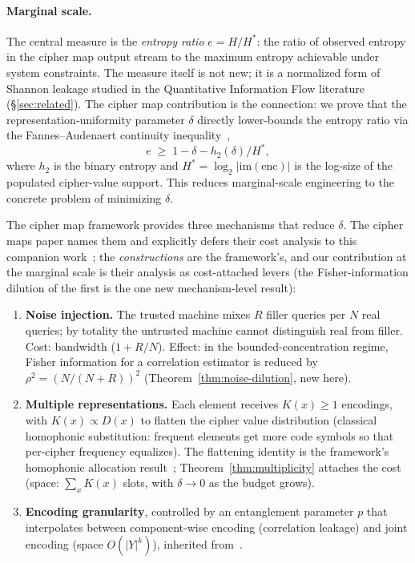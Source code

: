 \documentclass[conference]{IEEEtran}
\theoremstyle{definition}
\theoremstyle{plain}
\theoremstyle{remark}
\newcommand{\enc}{\mathrm{enc}}
\begin{document}
\paragraph{Marginal scale.}
The central measure is the \emph{entropy ratio} $e = H/H^*$: the ratio
of observed entropy in the cipher map output stream to the maximum
entropy achievable under system constraints.  The measure itself is
not new; it is a normalized form of Shannon leakage studied in the
Quantitative Information Flow literature
(\S\ref{sec:related}).  The cipher map contribution is the connection:
we prove that the representation-uniformity parameter $\delta$
directly lower-bounds the entropy ratio via the Fannes--Audenaert
continuity inequality~\cite{fannes1973continuity,audenaert2007sharp},
\[
e \;\geq\; 1 - \delta - h_2(\delta)/H^*,
\]
where $h_2$ is the binary entropy and $H^* = \log_2|\mathrm{im}(\enc)|$
is the log-size of the populated cipher-value support.  This reduces
marginal-scale
engineering to the concrete problem of minimizing $\delta$.

The cipher map framework provides three mechanisms that reduce
$\delta$.  The cipher maps paper names them and explicitly defers
their cost analysis to this companion
work~\cite[Rem.~5.1]{towell2026cipher}; the \emph{constructions} are
the framework's, and our contribution at the marginal scale is their
analysis as cost-attached levers (the Fisher-information dilution of
the first is the one new mechanism-level result):

\begin{enumerate}
\item \textbf{Noise injection.}  The trusted machine mixes $R$ filler
  queries per $N$ real queries; by totality the untrusted machine
  cannot distinguish real from filler.  Cost: bandwidth ($1 + R/N$).
  Effect: in the bounded-concentration regime, Fisher information for a
  correlation estimator is reduced by $\rho^2 = (N/(N+R))^2$
  (Theorem~\ref{thm:noise-dilution}, new here).

\item \textbf{Multiple representations.}  Each element receives
  $K(x) \geq 1$ encodings, with $K(x) \propto D(x)$ to flatten the
  cipher value distribution (classical homophonic substitution:
  frequent elements get more code symbols so that per-cipher frequency
  equalizes).  The flattening identity is the framework's homophonic
  allocation result~\cite[Prop.~4.1]{towell2026cipher};
  Theorem~\ref{thm:multiplicity} attaches the cost (space:
  $\sum_x K(x)$ slots, with $\delta \to 0$ as the budget grows).

\item \textbf{Encoding granularity}, controlled by an entanglement
  parameter $p$ that interpolates between component-wise encoding
  (correlation leakage) and joint encoding (space $O(|Y|^k)$),
  inherited from~\cite[Sec.~8]{towell2026cipher}.
\end{enumerate}
\end{document}
